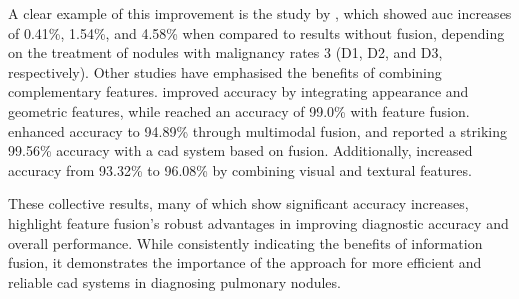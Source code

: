 A clear example of this improvement is the study by \textcite{xie_fusing_2018}, which showed \ac{auc} increases of 0.41\%, 1.54\%, and 4.58\% when compared to results without fusion, depending on the treatment of nodules with malignancy rates 3 (D1, D2, and D3, respectively).
Other studies have emphasised the benefits of combining complementary features. \textcite{shaffie_computer-assisted_2022} improved accuracy by integrating appearance and geometric features, while \textcite{saba_lung_2019} reached an accuracy of 99.0\% with feature fusion. \textcite{yuan_multi-modal_2023} enhanced accuracy to 94.89\% through multimodal fusion, and \textcite{liu_artificial_2022} reported a striking 99.56\% accuracy with a \ac{cad} system based on fusion. Additionally, \textcite{iqbal_fusion_2023} increased accuracy from 93.32\% to 96.08\% by combining visual and textural features.

These collective results, many of which show significant accuracy increases, highlight feature fusion's robust advantages in improving diagnostic accuracy and overall performance. While consistently indicating the benefits of information fusion, it demonstrates the importance of the approach for more efficient and reliable \ac{cad} systems in diagnosing pulmonary nodules.